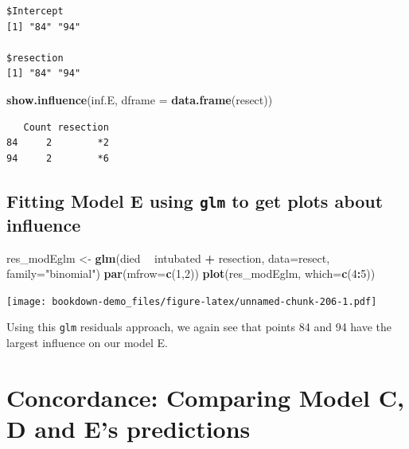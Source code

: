 \documentclass[]{book}
\newenvironment{Shaded}{\begin{snugshade}}{\end{snugshade}}
\newcommand{\KeywordTok}[1]{\textcolor[rgb]{0.13,0.29,0.53}{\textbf{#1}}}
\newcommand{\DataTypeTok}[1]{\textcolor[rgb]{0.13,0.29,0.53}{#1}}
\newcommand{\DecValTok}[1]{\textcolor[rgb]{0.00,0.00,0.81}{#1}}
\newcommand{\StringTok}[1]{\textcolor[rgb]{0.31,0.60,0.02}{#1}}
\newcommand{\OperatorTok}[1]{\textcolor[rgb]{0.81,0.36,0.00}{\textbf{#1}}}
\newcommand{\NormalTok}[1]{#1}
\theoremstyle{definition}
\theoremstyle{definition}
\theoremstyle{definition}
\theoremstyle{remark}
\begin{document}
\begin{verbatim}
$Intercept
[1] "84" "94"

$resection
[1] "84" "94"
\end{verbatim}

\begin{Shaded}
\begin{Highlighting}[]
\KeywordTok{show.influence}\NormalTok{(inf.E, }\DataTypeTok{dframe =} \KeywordTok{data.frame}\NormalTok{(resect))}
\end{Highlighting}
\end{Shaded}

\begin{verbatim}
   Count resection
84     2        *2
94     2        *6
\end{verbatim}

\subsection{\texorpdfstring{Fitting Model E using \texttt{glm} to get
plots about
influence}{Fitting Model E using glm to get plots about influence}}\label{fitting-model-e-using-glm-to-get-plots-about-influence}

\begin{Shaded}
\begin{Highlighting}[]
\NormalTok{res_modEglm <-}\StringTok{ }\KeywordTok{glm}\NormalTok{(died }\OperatorTok{~}\StringTok{ }\NormalTok{intubated }\OperatorTok{+}\StringTok{ }\NormalTok{resection, }
                  \DataTypeTok{data=}\NormalTok{resect, }\DataTypeTok{family=}\StringTok{"binomial"}\NormalTok{)}
\KeywordTok{par}\NormalTok{(}\DataTypeTok{mfrow=}\KeywordTok{c}\NormalTok{(}\DecValTok{1}\NormalTok{,}\DecValTok{2}\NormalTok{))}
\KeywordTok{plot}\NormalTok{(res_modEglm, }\DataTypeTok{which=}\KeywordTok{c}\NormalTok{(}\DecValTok{4}\OperatorTok{:}\DecValTok{5}\NormalTok{))}
\end{Highlighting}
\end{Shaded}

\texttt{[image: bookdown-demo\_files/figure-latex/unnamed-chunk-206-1.pdf]}

Using this \texttt{glm} residuals approach, we again see that points 84
and 94 have the largest influence on our model E.

\section{Concordance: Comparing Model C, D and E's
predictions}\label{concordance-comparing-model-c-d-and-es-predictions}
\end{document}
